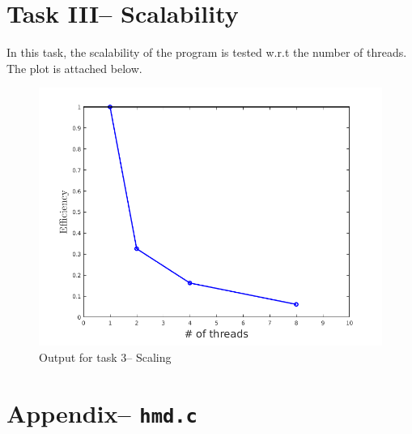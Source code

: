 \documentclass[11pt, oneside]{article}   	%
\begin{document}
\section{Task III-- Scalability}
In this task, the scalability of the program is tested w.r.t the number of threads. The plot is attached below.
\begin{figure}[!htbp]
	\centering
	\includegraphics[scale=0.4]{scaling.png}
	\caption{Output for task 3-- Scaling}
\end{figure}


\appendix
\section{Appendix-- \texttt{hmd.c}}

\end{document}
